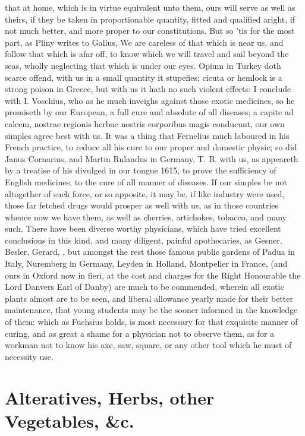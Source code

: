 {that at home, which is in virtue equivalent unto them, ours will serve
as well as theirs, if they be taken in proportionable quantity, fitted
and qualified aright, if not much better, and more proper to our
constitutions. But so 'tis for the most part, as Pliny writes to
Gallus, We are careless of that which is near us, and follow that
which is afar off, to know which we will travel and sail beyond the
seas, wholly neglecting that which is under our eyes. Opium in Turkey
doth scarce offend, with us in a small quantity it stupefies; cicuta or
hemlock is a strong poison in Greece, but with us it hath no such
violent effects: I conclude with I. Voschius, who as he much inveighs
against those exotic medicines, so he promiseth by our European, a full
cure and absolute of all diseases; a capite ad calcem, nostrae regionis
herbae nostris corporibus magis conducunt, our own simples agree best
with us. It was a thing that Fernelius much laboured in his French
practice, to reduce all his cure to our proper and domestic physic; so
did Janus Cornarius, and Martin Rulandus in Germany. T. B. with
us, as appeareth by a treatise of his divulged in our tongue 1615, to
prove the sufficiency of English medicines, to the cure of all manner
of diseases. If our simples be not altogether of such force, or so
apposite, it may be, if like industry were used, those far fetched
drugs would prosper as well with us, as in those countries whence now
we have them, as well as cherries, artichokes, tobacco, and many such.
There have been diverse worthy physicians, which have tried excellent
conclusions in this kind, and many diligent, painful apothecaries, as
Gesner, Besler, Gerard, \etc{}, but amongst the rest those famous public
gardens of Padua in Italy, Nuremberg in Germany, Leyden in Holland,
Montpelier in France, (and ours in Oxford now in fieri, at the cost and
charges for the Right Honourable the Lord Danvers Earl of Danby) are
much to be commended, wherein all exotic plants almost are to be seen,
and liberal allowance yearly made for their better maintenance, that
young students may be the sooner informed in the knowledge of them:
which as Fuchsius holds, is most necessary for that exquisite
manner of curing, and as great a shame for a physician not to observe
them, as for a workman not to know his axe, saw, square, or any other
tool which he must of necessity use.

\section{Alteratives, Herbs, other Vegetables, \&c.}

}
